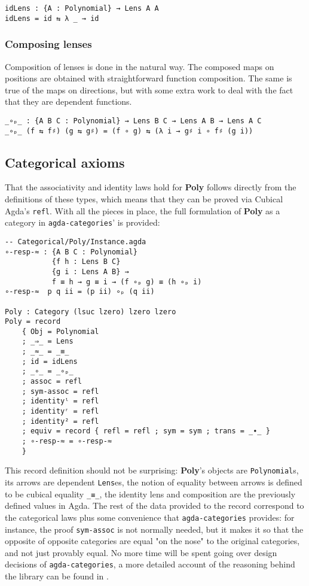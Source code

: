 \begin{verbatim}
idLens : {A : Polynomial} → Lens A A
idLens = id ⇆ λ _ → id
\end{verbatim}

\subsubsection{Composing lenses}
Composition of lenses is done in the natural way. The composed maps on positions are obtained with straightforward function composition. The same is true of the maps on directions, but with some extra work to deal with the fact that they are dependent functions.

\begin{verbatim}
_∘ₚ_ : {A B C : Polynomial} → Lens B C → Lens A B → Lens A C
_∘ₚ_ (f ⇆ f♯) (g ⇆ g♯) = (f ∘ g) ⇆ (λ i → g♯ i ∘ f♯ (g i))
\end{verbatim}

\subsection{Categorical axioms}

That the associativity and identity laws hold for \textbf{Poly} follows directly from the definitions of these types, which means that they can be proved via Cubical Agda's \texttt{refl}.
With all the pieces in place, the full formulation of \textbf{Poly} as a category in \texttt{agda-categories}' is provided:

\begin{verbatim}
-- Categorical/Poly/Instance.agda
∘-resp-≈ : {A B C : Polynomial} 
           {f h : Lens B C} 
           {g i : Lens A B} → 
           f ≡ h → g ≡ i → (f ∘ₚ g) ≡ (h ∘ₚ i)
∘-resp-≈  p q ii = (p ii) ∘ₚ (q ii)

Poly : Category (lsuc lzero) lzero lzero
Poly = record
    { Obj = Polynomial
    ; _⇒_ = Lens
    ; _≈_ = _≡_
    ; id = idLens
    ; _∘_ = _∘ₚ_
    ; assoc = refl
    ; sym-assoc = refl
    ; identityˡ = refl
    ; identityʳ = refl
    ; identity² = refl
    ; equiv = record { refl = refl ; sym = sym ; trans = _∙_ }
    ; ∘-resp-≈ = ∘-resp-≈
    }
\end{verbatim}

This record definition should not be surprising: \textbf{Poly}'s objects are \texttt{Polynomial}s, its arrows are dependent \texttt{Lens}es, the notion of equality between arrows is defined to be cubical equality \texttt{_≡_}, the identity lens and composition are the previously defined values in Agda.
The rest of the data provided to the record correspond to the categorical laws plus some convenience that \texttt{agda-categories} provides: for instance, the proof \texttt{sym-assoc} is not normally needed, but it makes it so that the opposite of opposite categories are equal "on the nose" to the original categories, and not just provably equal. 
No more time will be spent going over design decisions of \texttt{agda-categories}, a more detailed account of the reasoning behind the library can be found in \cite{agda-cats}.

